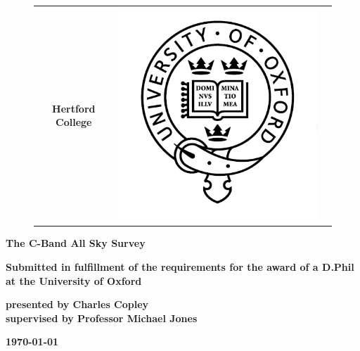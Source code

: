 \documentclass[english,a4paper,titlepage,12pt]{report}
\begin{document}
\begin{center}
\begin{figure}[ht]
\begin{tabular}{ccc}
\begin{minipage}{9cm}
\textbf{\large Hertford College}
\end{minipage}
&
\begin{minipage}{3cm}
\includegraphics[scale=0.25]{./images/logos/OxfordLogo.png}
\end{minipage}
\end{tabular}
\end{figure}
\vspace{4 cm}



\textbf{\huge The C-Band All Sky Survey}
\vspace{1 cm}


\textbf{{\large Submitted in fulfillment of the
requirements for the award
of a D.Phil
at the University of Oxford
}}
\vspace{7 cm}


\textbf{\large presented by Charles Copley\\supervised by Professor Michael Jones}
\vspace{1 cm}

\textbf{\today}
\end{center}
\cleardoublepage
\end{document}
